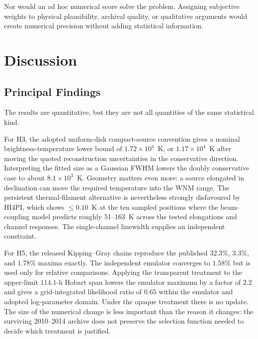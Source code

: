\documentclass[crop]{CSL}
\begin{document}
Nor would an ad hoc numerical score solve the problem. Assigning subjective weights to physical plausibility, archival quality, or qualitative arguments would create numerical precision without adding statistical information.


\section{Discussion}
\label{sec:discussion}

\subsection{Principal Findings}

The results are quantitative, but they are not all quantities of the same statistical kind.

For H3, the adopted uniform-disk compact-source convention gives a nominal brightness-temperature lower bound of $1.72\times10^4$~K, or $1.17\times10^4$~K after moving the quoted reconstruction uncertainties in the conservative direction. Interpreting the fitted size as a Gaussian FWHM lowers the doubly conservative case to about $8.1\times10^3$~K. Geometry matters even more: a source elongated in declination can move the required temperature into the WNM range. The persistent thermal-filament alternative is nevertheless strongly disfavoured by HI4PI, which shows $\leq0.10$~K at the ten sampled positions where the beam-coupling model predicts roughly 51--163~K across the tested elongations and channel responses. The single-channel linewidth supplies an independent constraint.

For H5, the released Kipping--Gray chains reproduce the published $32.3\%$, $3.3\%$, and $1.78\%$ maxima exactly. The independent emulator converges to $1.58\%$ but is used only for relative comparisons. Applying the transparent treatment to the upper-limit $114.1$-h Hobart span lowers the emulator maximum by a factor of 2.2 and gives a grid-integrated likelihood ratio of $0.65$ within the emulator and adopted log-parameter domain. Under the opaque treatment there is no update. The size of the numerical change is less important than the reason it changes: the surviving 2010--2014 archive does not preserve the selection function needed to decide which treatment is justified.
\end{document}
